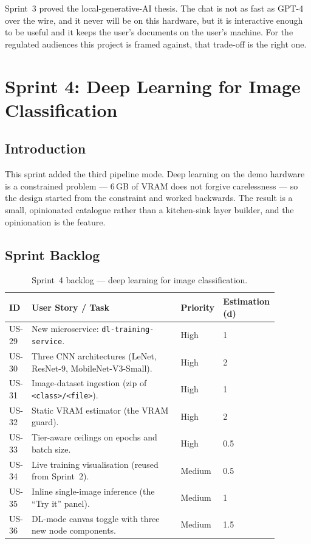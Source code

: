 \documentclass[12pt, a4paper, oneside]{report}
\begin{document}
Sprint~3 proved the local-generative-AI thesis. The chat is not as
fast as GPT-4 over the wire, and it never will be on this hardware,
but it is interactive enough to be useful and it keeps the user's
documents on the user's machine. For the regulated audiences this
project is framed against, that trade-off is the right one.

\chapter{Sprint 4: Deep Learning for Image Classification}

\section*{Introduction}

This sprint added the third pipeline mode. Deep learning on the demo
hardware is a constrained problem --- 6\,GB of VRAM does not forgive
carelessness --- so the design started from the constraint and
worked backwards. The result is a small, opinionated catalogue
rather than a kitchen-sink layer builder, and the opinionation is
the feature.

\section{Sprint Backlog}

\begin{table}[H]
\centering
\caption{Sprint~4 backlog --- deep learning for image classification.}
\label{tab:sprint4_backlog}
\begin{tabular}{|p{0.05\linewidth}|L{0.55\linewidth}|p{0.1\linewidth}|p{0.18\linewidth}|}
\hline
\textbf{ID} & \textbf{User Story / Task} & \textbf{Priority} & \textbf{Estimation (d)} \\
\hline
US-29 & New microservice: \texttt{dl-training-service}. & High & 1 \\ \hline
US-30 & Three CNN architectures (LeNet, ResNet-9, MobileNet-V3-Small). & High & 2 \\ \hline
US-31 & Image-dataset ingestion (zip of \texttt{<class>/<file>}). & High & 1 \\ \hline
US-32 & Static VRAM estimator (the VRAM guard). & High & 2 \\ \hline
US-33 & Tier-aware ceilings on epochs and batch size. & High & 0.5 \\ \hline
US-34 & Live training visualisation (reused from Sprint~2). & Medium & 0.5 \\ \hline
US-35 & Inline single-image inference (the ``Try it'' panel). & Medium & 1 \\ \hline
US-36 & DL-mode canvas toggle with three new node components. & Medium & 1.5 \\
\hline
\end{tabular}
\end{table}
\end{document}
